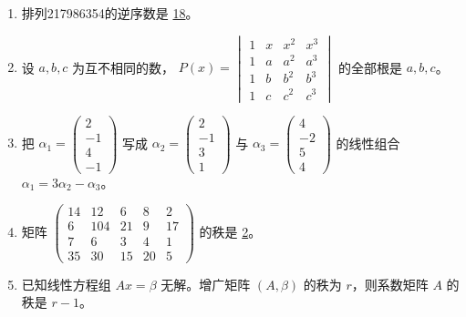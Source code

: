 \documentclass[lang=cn,12pt]{elegantbook}
\begin{document}
\begin{example}
    \begin{enumerate}
        \item 排列217986354的逆序数是 \underline{18}。
        
        \item 设 $a, b, c$ 为互不相同的数，
        $P(x) = \begin{vmatrix} 
        1 & x & x^2 & x^3 \\ 
        1 & a & a^2 & a^3 \\ 
        1 & b & b^2 & b^3 \\ 
        1 & c & c^2 & c^3 
        \end{vmatrix}$ 的全部根是 \underline{$a, b, c$}。
        
        \item 把 $\alpha_1 = \begin{pmatrix} 2 \\ -1 \\ 4 \\ -1 \end{pmatrix}$ 
        写成 $\alpha_2 = \begin{pmatrix} 2 \\ -1 \\ 3 \\ 1 \end{pmatrix}$ 与 
        $\alpha_3 = \begin{pmatrix} 4 \\ -2 \\ 5 \\ 4 \end{pmatrix}$ 的线性组合 \\
        \underline{$\alpha_1 = 3\alpha_2 - \alpha_3$}。
        
        \item 矩阵 $\begin{pmatrix} 
        14 & 12 & 6 & 8 & 2 \\ 
        6 & 104 & 21 & 9 & 17 \\ 
        7 & 6 & 3 & 4 & 1 \\ 
        35 & 30 & 15 & 20 & 5 
        \end{pmatrix}$ 的秩是 \underline{2}。
        
        \item 已知线性方程组 $Ax = \beta$ 无解。增广矩阵 $(A, \beta)$ 的秩为 $r$，则系数矩阵 $A$ 的秩是 \underline{$r-1$}。
    \end{enumerate}
\end{example}
\end{document}
